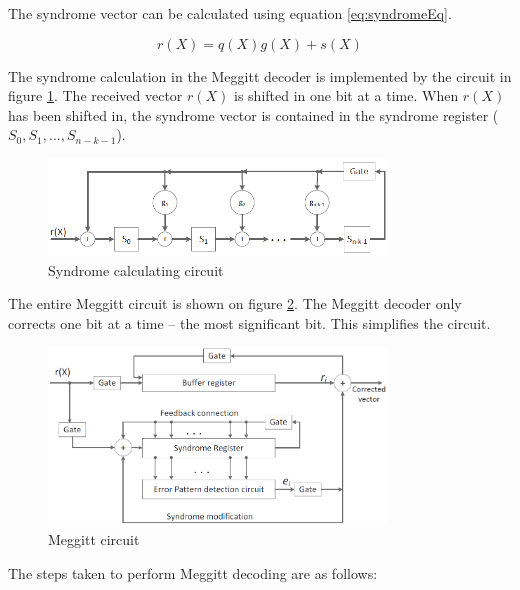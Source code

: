 \documentclass[Main]{subfiles}
\begin{document}
The syndrome vector can be calculated using equation \ref{eq:syndromeEq}.

\begin{equation} \label{eq:syndromeEq}
r(X) = q(X)g(X)+s(X)
\end{equation}

The syndrome calculation in the Meggitt decoder is implemented by the circuit in figure \ref{fig:syndromeCirc}. The received vector $r(X)$ is shifted in one bit at a time. When $r(X)$ has been shifted in, the syndrome vector is contained in the syndrome register ($S_0, S_1, ... ,S_{n-k-1}$).

\begin{figure}[H]
    \centering
    \includegraphics[width=0.8\textwidth]{figures/syndromeCircuit}
    \caption{Syndrome calculating circuit}
    \label{fig:syndromeCirc}
\end{figure}

The entire Meggitt circuit is shown on figure \ref{fig:meggitCirc}. The Meggitt decoder only corrects one bit at a time -- the most significant bit. This simplifies the circuit.

\begin{figure}[H]
    \centering
    \includegraphics[width=0.8\textwidth]{figures/meggitCircuit}
    \caption{Meggitt circuit}
    \label{fig:meggitCirc}
\end{figure}

The steps taken to perform Meggitt decoding are as follows:
\end{document}
